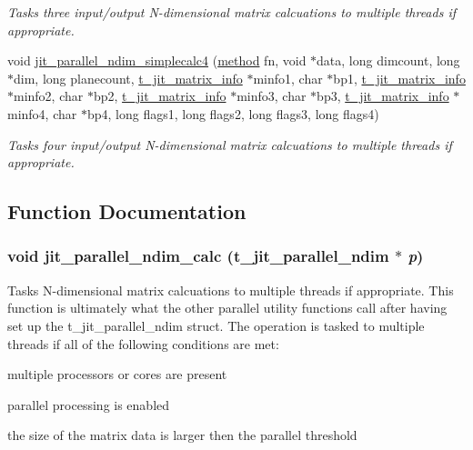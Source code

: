 \begin{DoxyCompactItemize}
\begin{DoxyCompactList}\small\item\em Tasks three input/output N-\/dimensional matrix calcuations to multiple threads if appropriate. \item\end{DoxyCompactList}\item 
void \hyperlink{group__parallelutilmod_gaa8c8a53219e8e31057fdf4cea80e8081}{jit\_\-parallel\_\-ndim\_\-simplecalc4} (\hyperlink{group__datatypes_gac26ba0a173b50597f5738132e059b42d}{method} fn, void $\ast$data, long dimcount, long $\ast$dim, long planecount, \hyperlink{structt__jit__matrix__info}{t\_\-jit\_\-matrix\_\-info} $\ast$minfo1, char $\ast$bp1, \hyperlink{structt__jit__matrix__info}{t\_\-jit\_\-matrix\_\-info} $\ast$minfo2, char $\ast$bp2, \hyperlink{structt__jit__matrix__info}{t\_\-jit\_\-matrix\_\-info} $\ast$minfo3, char $\ast$bp3, \hyperlink{structt__jit__matrix__info}{t\_\-jit\_\-matrix\_\-info} $\ast$minfo4, char $\ast$bp4, long flags1, long flags2, long flags3, long flags4)
\begin{DoxyCompactList}\small\item\em Tasks four input/output N-\/dimensional matrix calcuations to multiple threads if appropriate. \item\end{DoxyCompactList}\end{DoxyCompactItemize}


\subsection{Function Documentation}
\hypertarget{group__parallelutilmod_gad3af91109732554c8d7bbdb5b575bdc3}{
\subsubsection[{jit\_\-parallel\_\-ndim\_\-calc}]{\setlength{\rightskip}{0pt plus 5cm}void jit\_\-parallel\_\-ndim\_\-calc (t\_\-jit\_\-parallel\_\-ndim $\ast$ {\em p})}}
\label{group__parallelutilmod_gad3af91109732554c8d7bbdb5b575bdc3}


Tasks N-\/dimensional matrix calcuations to multiple threads if appropriate. This function is ultimately what the other parallel utility functions call after having set up the t\_\-jit\_\-parallel\_\-ndim struct. The operation is tasked to multiple threads if all of the following conditions are met:
\begin{DoxyItemize}
\item multiple processors or cores are present
\item parallel processing is enabled
\item the size of the matrix data is larger then the parallel threshold
\end{DoxyItemize}


